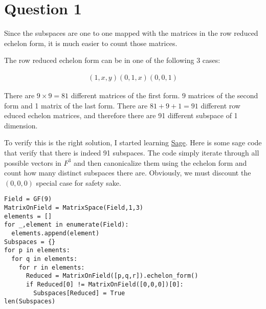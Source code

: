 \section*{Question 1}
Since the subspaces are one to one mapped with the matrices in the row reduced echelon form, it is much easier to count those matrices.

The row reduced echelon form can be in one of the following 3 cases:

\begin{eqnarray*}
  \left(1, x, y\right)
  \left(0, 1, x\right)
  \left(0, 0, 1\right)
\end{eqnarray*}

There are $ 9 \times 9 = 81 $ different matrices of the first form. $ 9 $ matrices of the second form and 1 matrix of the last form. There are $ 81 + 9 + 1 = 91 $ different row educed echelon matrices, and therefore there are 91 different subspace of 1 dimension.

To verify this is the right solution, I started learning \href{https://www.sagemath.org/}{Sage}. Here is some sage code that verify that there is indeed 91 subspaces. The code simply iterate through all possible vectors in $ F^3 $ and then canonicalize them using the echelon form and count how many distinct subspaces there are. Obviously, we must discount the $ \left(0, 0, 0\right) $ special case for safety sake.

\begin{verbatim}
Field = GF(9)
MatrixOnField = MatrixSpace(Field,1,3)
elements = []
for _,element in enumerate(Field):
  elements.append(element)
Subspaces = {}
for p in elements:
  for q in elements:
    for r in elements:
      Reduced = MatrixOnField([p,q,r]).echelon_form()
      if Reduced[0] != MatrixOnField([0,0,0])[0]:
        Subspaces[Reduced] = True
len(Subspaces)
\end{verbatim}